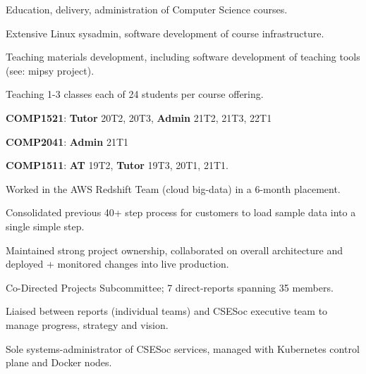 \documentclass[a4paper]{deedy-resume}
\begin{document}
\begin{minipage}[t]{0.66\textwidth}
\begin{tightitemize}
\item Education, delivery, administration of Computer Science courses.
\item Extensive Linux sysadmin,
	  software development of course infrastructure.
\item Teaching materials development, including software
	  development of teaching tools (see: mipsy project).
\item Teaching 1-3 classes each of 24 students per course offering.
\item \textbf{COMP1521}: \textbf{Tutor} 20T2, 20T3,
						 \textbf{Admin} 21T2, 21T3, 22T1
\item \textbf{COMP2041}: \textbf{Admin} 21T1
\item \textbf{COMP1511}: \textbf{AT}    19T2,
						 \textbf{Tutor} 19T3, 20T1, 21T1.
\end{tightitemize}

\sectionspace



\begin{tightitemize}
\item Worked in the AWS Redshift Team (cloud big-data)
	  in a 6-month placement.
\item Consolidated previous 40+ step process for customers
	  to load sample data into a single simple step.
\item Maintained strong project ownership, collaborated
	  on overall architecture and deployed + monitored changes
	  into live production.
\end{tightitemize}

\sectionspace



\begin{tightitemize}
\item Co-Directed Projects Subcommittee;
	  7 direct-reports spanning 35 members.
\item Liaised between reports (individual teams) and
	  CSESoc executive team to manage progress,
	  strategy and vision.
\item Sole systems-administrator of CSESoc services,
	  managed with Kubernetes control plane and
	  Docker nodes.
\end{tightitemize}


\end{minipage}
\end{document}
